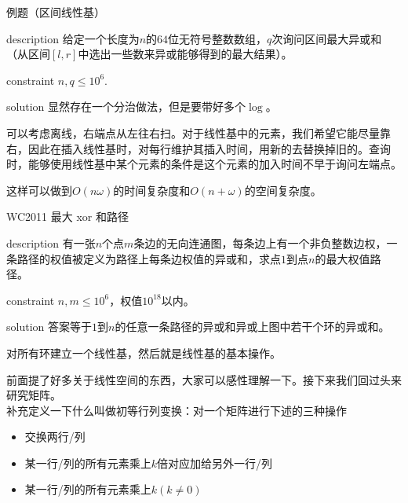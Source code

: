 \documentclass{beamer}
\begin{document}
\begin{frame}{例题（区间线性基）}
\begin{block}{description}
	给定一个长度为$n$的$64$位无符号整数数组，$q$次询问区间最大异或和（从区间$[l, r]$中选出一些数来异或能够得到的最大结果）。
\end{block}
\begin{block}{constraint}
	$n, q \le 10^6.$
\end{block}
\pause
\begin{block}{solution}
	显然存在一个分治做法，但是要带好多个$\log$。
	
	可以考虑离线，右端点从左往右扫。对于线性基中的元素，我们希望它能尽量靠右，因此在插入线性基时，对每行维护其插入时间，用新的去替换掉旧的。查询时，能够使用线性基中某个元素的条件是这个元素的加入时间不早于询问左端点。
	
	这样可以做到$O(n\omega)$的时间复杂度和$O(n + \omega)$的空间复杂度。
\end{block}
	
\end{frame}

\begin{frame}{WC2011 最大 xor 和路径}
\begin{block}{description}
	有一张$n$个点$m$条边的无向连通图，每条边上有一个非负整数边权，一条路径的权值被定义为路径上每条边权值的异或和，求点$1$到点$n$的最大权值路径。

\end{block}
\begin{block}{constraint}
	$n, m \le 10^6$，权值$10^{18}$以内。
\end{block}
\pause
\begin{block}{solution}
	答案等于$1$到$n$的任意一条路径的异或和异或上图中若干个环的异或和。
	
	对所有环建立一个线性基，然后就是线性基的基本操作。
\end{block}
	
\end{frame}

\begin{frame}
	前面提了好多关于线性空间的东西，大家可以感性理解一下。接下来我们回过头来研究矩阵。\\
	
	补充定义一下什么叫做初等行列变换：对一个矩阵进行下述的三种操作
	\begin{itemize}
		\item 交换两行/列
		\item 某一行/列的所有元素乘上$k$倍对应加给另外一行/列
		\item 某一行/列的所有元素乘上$k(k \neq 0)$
	\end{itemize}
\end{frame}
\end{document}
